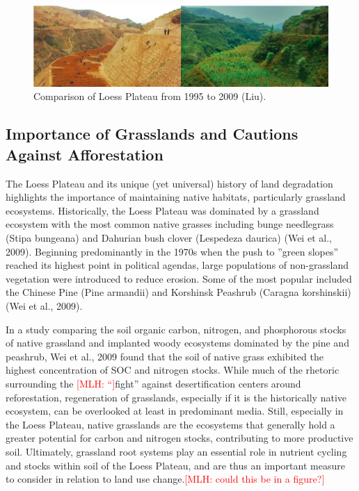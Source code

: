 \documentclass{book}\usepackage{knitr}
\newcommand{\red}[1]{\textcolor{red}{[MLH: #1]}}
\begin{document}
\begin{knitrout}
\begin{kframe}
{\begin{figure}
\includegraphics[width=\linewidth]{images/land-use/Loess-Comparison.png}
\caption{Comparison of Loess Plateau from 1995 to 2009 (Liu).}
\label{fig:Loess-Comparison}
\end{figure}

\subsection{Importance of Grasslands and Cautions Against Afforestation}
The Loess Plateau and its unique (yet universal) history of land degradation highlights the importance of maintaining native habitats, particularly grassland ecosystems. Historically, the Loess Plateau was dominated by a grassland ecosystem with the most common native grasses including bunge needlegrass (Stipa bungeana) and Dahurian bush clover (Lespedeza daurica) (Wei et al., 2009). Beginning predominantly in the 1970s when the push to ''green slopes'' reached its highest point in political agendas, large populations of non-grassland vegetation were introduced to reduce erosion. Some of the most popular included the Chinese Pine (Pine armandii)  and Korshinsk Peashrub (Caragna korshinskii) (Wei et al., 2009).

In a study comparing the soil organic carbon, nitrogen, and phosphorous stocks of native grassland and implanted woody ecosystems dominated by the pine and peashrub, Wei et al., 2009 found that the soil of native grass exhibited the highest concentration of SOC and nitrogen stocks. While much of the rhetoric surrounding the \red{“}fight” against desertification centers around reforestation, regeneration of grasslands, especially if it is the historically native ecosystem, can be overlooked at least in predominant media. Still, especially in the Loess Plateau, native grasslands are the ecosystems that generally hold a greater potential for carbon and nitrogen stocks, contributing to more productive soil. Ultimately, grassland root systems play an essential role in nutrient cycling and stocks within soil of the Loess Plateau, and are thus an important measure to consider in relation to land use change.\red{could this be in a figure?}

}
\end{kframe}
\end{knitrout}
\end{document}
